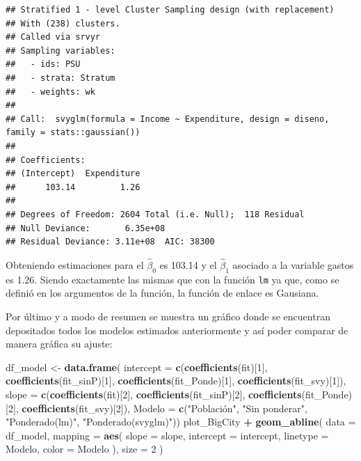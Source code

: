 \documentclass[
  spanish,
  12pt,
]{book}
\newenvironment{Shaded}{\begin{snugshade}}{\end{snugshade}}
\newcommand{\AttributeTok}[1]{\textcolor[rgb]{0.13,0.29,0.53}{#1}}
\newcommand{\DecValTok}[1]{\textcolor[rgb]{0.00,0.00,0.81}{#1}}
\newcommand{\FunctionTok}[1]{\textcolor[rgb]{0.13,0.29,0.53}{\textbf{#1}}}
\newcommand{\NormalTok}[1]{#1}
\newcommand{\OtherTok}[1]{\textcolor[rgb]{0.56,0.35,0.01}{#1}}
\newcommand{\SpecialCharTok}[1]{\textcolor[rgb]{0.81,0.36,0.00}{\textbf{#1}}}
\newcommand{\StringTok}[1]{\textcolor[rgb]{0.31,0.60,0.02}{#1}}
\begin{document}
\begin{verbatim}
## Stratified 1 - level Cluster Sampling design (with replacement)
## With (238) clusters.
## Called via srvyr
## Sampling variables:
##   - ids: PSU 
##   - strata: Stratum 
##   - weights: wk 
## 
## Call:  svyglm(formula = Income ~ Expenditure, design = diseno, family = stats::gaussian())
## 
## Coefficients:
## (Intercept)  Expenditure  
##      103.14         1.26  
## 
## Degrees of Freedom: 2604 Total (i.e. Null);  118 Residual
## Null Deviance:       6.35e+08 
## Residual Deviance: 3.11e+08  AIC: 38300
\end{verbatim}

Obteniendo estimaciones para el \(\hat{\beta}_{0}\) es 103.14 y el \(\hat{\beta}_{1}\) asociado a la variable gastos es 1.26. Siendo exactamente las mismas que con la función \texttt{lm} ya que, como se definió en los argumentos de la función, la función de enlace es Gausiana.

Por último y a modo de resumen se muestra un gráfico donde se encuentran depositados todos los modelos estimados anteriormente y así poder comparar de manera gráfica su ajuste:

\begin{Shaded}
\begin{Highlighting}[]
\NormalTok{df\_model }\OtherTok{\textless{}{-}} \FunctionTok{data.frame}\NormalTok{(}
  \AttributeTok{intercept =} \FunctionTok{c}\NormalTok{(}\FunctionTok{coefficients}\NormalTok{(fit)[}\DecValTok{1}\NormalTok{],}
               \FunctionTok{coefficients}\NormalTok{(fit\_sinP)[}\DecValTok{1}\NormalTok{],}
               \FunctionTok{coefficients}\NormalTok{(fit\_Ponde)[}\DecValTok{1}\NormalTok{],}
               \FunctionTok{coefficients}\NormalTok{(fit\_svy)[}\DecValTok{1}\NormalTok{]),}
  \AttributeTok{slope =} \FunctionTok{c}\NormalTok{(}\FunctionTok{coefficients}\NormalTok{(fit)[}\DecValTok{2}\NormalTok{],}
               \FunctionTok{coefficients}\NormalTok{(fit\_sinP)[}\DecValTok{2}\NormalTok{],}
               \FunctionTok{coefficients}\NormalTok{(fit\_Ponde)[}\DecValTok{2}\NormalTok{],}
               \FunctionTok{coefficients}\NormalTok{(fit\_svy)[}\DecValTok{2}\NormalTok{]),}
  \AttributeTok{Modelo =} \FunctionTok{c}\NormalTok{(}\StringTok{"Población"}\NormalTok{, }\StringTok{"Sin ponderar"}\NormalTok{,}
             \StringTok{"Ponderado(lm)"}\NormalTok{, }\StringTok{"Ponderado(svyglm)"}\NormalTok{))}
\NormalTok{plot\_BigCity }\SpecialCharTok{+}  \FunctionTok{geom\_abline}\NormalTok{( }\AttributeTok{data =}\NormalTok{ df\_model,}
    \AttributeTok{mapping =} \FunctionTok{aes}\NormalTok{( }\AttributeTok{slope =}\NormalTok{ slope,}
      \AttributeTok{intercept =}\NormalTok{ intercept, }\AttributeTok{linetype =}\NormalTok{ Modelo,}
      \AttributeTok{color =}\NormalTok{ Modelo ), }\AttributeTok{size =} \DecValTok{2}
\NormalTok{  )}
\end{Highlighting}
\end{Shaded}
\end{document}
